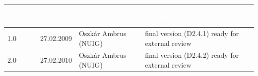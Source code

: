 \documentclass{fast_latex}
\newcommand\authorOne{Oszk\'{a}r Ambrus (NUIG)}
\newcommand\authorTwo{Albert Z\"{u}ndorf (UniKassel)}
\begin{document}
\begin{small}
\begin{tabular}{|l|l|l|p{7.5cm}|}
\hline
\rowcolor{fast@lightgrey}\textcolor{white}{\textbf{Rev. No.}} &
                            \textcolor{white}{\textbf{Date}} &
                            \textcolor{white}{\textbf{Author (Partner)}} &
                            \textcolor{white}{\textbf{Change description}}\\ \hline
1.0 & 27.02.2009 & \authorOne & final version (D2.4.1) ready for external review \\ \hline
2.0 & 27.02.2010 & \authorOne & final version (D2.4.2) ready for external review \\ \hline
\end{tabular}
\end{small}

\color{black}

\vfill
\end{document}
